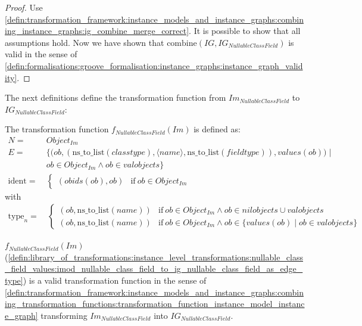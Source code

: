 \begin{proof}
Use \cref{defin:transformation_framework:instance_models_and_instance_graphs:combining_instance_graphs:ig_combine_merge_correct}. It is possible to show that all assumptions hold. Now we have shown that $\mathrm{combine}(IG, IG_{NullableClassField})$ is valid in the sense of \cref{defin:formalisations:groove_formalisation:instance_graphs:instance_graph_validity}.
\end{proof}

The next definitions define the transformation function from $Im_{NullableClassField}$ to $IG_{NullableClassField}$:

\begin{defin}
\label{defin:library_of_transformations:instance_level_transformations:nullable_class_field_values:imod_nullable_class_field_to_ig_nullable_class_field_as_edge_type}
The transformation function $f_{NullableClassField}(Im)$ is defined as:
\begin{align*}
N =\ & Object_{Im}  \\
E =\ & \big\{\big(ob, (\mathrm{ns\_\!to\_\!list}(classtype), \langle name \rangle, \mathrm{ns\_\!to\_\!list}(fieldtype)), values(ob)\big) \mid\\&ob \in Object_{Im} \land ob \in valobjects \big\} \\
\mathrm{ident} =\ & \begin{cases}
    (obids(ob), ob) & \mathrm{if }\ ob \in Object_{Im}
\end{cases}
\end{align*}
with
\begin{align*}
\mathrm{type}_n =\ & \begin{cases}
    (ob, \mathrm{ns\_\!to\_\!list}(name)) & \mathrm{if }\ ob \in Object_{Im} \land ob \in nilobjects \cup valobjects\\
    (ob, \mathrm{ns\_\!to\_\!list}(name)) & \mathrm{if }\ ob \in Object_{Im} \land ob \in \{values(ob) \mid ob \in valobjects\} 
\end{cases}
\end{align*}
\end{defin}

\begin{thm}
\label{defin:library_of_transformations:instance_level_transformations:nullable_class_field_values:imod_nullable_class_field_to_ig_nullable_class_field_as_edge_type_func}
$f_{NullableClassField}(Im)$ (\cref{defin:library_of_transformations:instance_level_transformations:nullable_class_field_values:imod_nullable_class_field_to_ig_nullable_class_field_as_edge_type}) is a valid transformation function in the sense of \cref{defin:transformation_framework:instance_models_and_instance_graphs:combining_transformation_functions:transformation_function_instance_model_instance_graph} transforming $Im_{NullableClassField}$ into $IG_{NullableClassField}$.
\end{thm}

